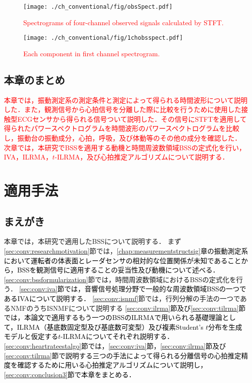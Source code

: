 \begin{figure}[tb]
\centering
\texttt{[image: ./ch\_conventional/fig/obsSpect.pdf]}
\caption{\textcolor{red}{Spectrograms of four-channel observed signals calculated by STFT.}}
\label{fig:4chobsspect}
\end{figure}

\begin{figure}[tb]
\centering
\texttt{[image: ./ch\_conventional/fig/1chobsspect.pdf]}
\caption{\textcolor{red}{Each component in first channel spectrogram.}}
\label{fig:1chobsspect}
\end{figure}

\clearpage
\section{本章のまとめ}
\label{sec:conv:conclusion2}
\textcolor{red}{本章では，振動測定系の測定条件と測定によって得られる時間波形について説明した．また，観測信号から心拍信号を分離した際に比較を行うために使用した接触型ECGセンサから得られる信号ついて説明した．その信号にSTFTを適用して得られたパワースペクトログラムを時間波形のパワースペクトログラムを比較し，振動台の振動成分，心拍，呼吸，及び体動等のその他の成分を確認した．
次章では，本研究でBSSを適用する動機と時間周波数領域BSSの定式化を行い，IVA，ILRMA，$t$-ILRMA，及び心拍推定アルゴリズムについて説明する．}


\chapter{適用手法}
\label{chap:methods}

\section{まえがき}
本章では，本研究で適用したBSSについて説明する．
まず\ref{sec:conv:researchmotivation}節では，\textcolor{black}{\ref{chap:measurementstructsig}章の振動測定系において運転者の体表面とレーダセンサの相対的な位置関係が未知であることから，BSSを観測信号に適用することの妥当性及び動機について述べる．}
\ref{sec:conv:bssformularization}節では，時間周波数領域におけるBSSの定式化を行う．
\textcolor{black}{\ref{sec:conv:iva}節では，音響信号処理分野で一般的な周波数領域BSSの一つであるIVAについて説明する．}
\ref{sec:conv:isnmf}節では，行列分解の手法の一つであるNMFのうちISNMFについて説明する
\textcolor{black}{\ref{sec:conv:ilrma}節及び\ref{sec:conv:tilrma}節では，本論文で適用するもう一つのBSSのILRMAで用いられる基礎理論として，ILRMA（基底数固定型及び基底数可変型）及び複素Student's $t$分布を生成モデルと仮定する$t$-ILRMAについてそれぞれ説明する．
\ref{sec:conv:heartrateestalgo}節では，\ref{sec:conv:iva}節，\ref{sec:conv:ilrma}節及び\ref{sec:conv:tilrma}節で説明する三つの手法によって得られる分離信号の心拍推定精度を確認するために用いる心拍推定アルゴリズムについて説明し，\ref{sec:conv:conclusion3}節で本章をまとめる．}


